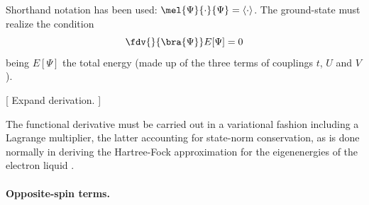 Shorthand notation has been used: $\mel{\Psi}{\cdot}{\Psi} = \langle \cdot \rangle$. 
The ground-state must realize the condition
\[
\fdv{}{\bra{\Psi}} E[\Psi] = 0
\]
being $E[\Psi]$ the total energy (made up of the three terms of couplings $t$, $U$ and $V$). 

{\color{tabred}[ Expand derivation. ]}

The functional derivative must be carried out in a variational fashion including a Lagrange multiplier, the latter accounting for state-norm conservation, as is done normally in deriving the Hartree-Fock approximation for the eigenenergies of the electron liquid \cite{grosso2014solid, giuliani2005quantum}. 

\paragraph{Opposite-spin terms.}

